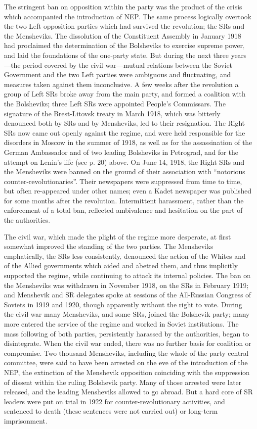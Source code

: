 The stringent ban on opposition within the party was the product of the crisis which accompanied the introduction of NEP. The same process logically overtook the two Left opposition parties which had survived the revolution; the SRs and the Mensheviks. The dissolution of the Constituent Assembly in January 1918 had proclaimed the determination of the Bolsheviks to exercise supreme power, and laid the foundations of the one-party state. But during the next three years---the period covered by the civil war---mutual relations between the Soviet Government and the two Left parties were ambiguous and fluctuating, and measures taken against them inconclusive. A few weeks after the revolution a group of Left SRs broke away from the main party, and formed a coalition with the Bolsheviks; three Left SRs were appointed People's Commissars. The signature of the Brest-Litovsk treaty in March 1918, which was bitterly denounced both by SRs and by Mensheviks, led to their resignation. The Right SRs now came out openly against the regime, and were held responsible for the disorders in Moscow in the summer of 1918, as well as for the assassination of the German Ambassador and of two leading Bolsheviks in Petrograd, and for the attempt on Lenin's life (see p. 20) above. On June 14, 1918, the Right SRs and the Mensheviks were banned on the ground of their association with ``notorious counter-revolutionaries''. Their newspapers were suppressed from time to time, but often re-appeared under other names; even a Kadet newspaper was published for some months after the revolution. Intermittent harassment, rather than the enforcement of a total ban, reflected ambivalence and hesitation on the part of the authorities. 

The civil war, which made the plight of the regime more desperate, at first somewhat improved the standing of the two parties. The Mensheviks emphatically, the SRs less consistently, denounced the action of the Whites and of the Allied governments which aided and abetted them, and thus implicitly supported the regime, while continuing to attack its internal policies. The ban on the Mensheviks was withdrawn in November 1918, on the SRs in February 1919; and Menshevik and SR delegates spoke at sessions of the All-Russian Congress of Soviets in 1919 and 1920, though apparently without the right to vote. During the civil war many Mensheviks, and some SRs, joined the Bolshevik party; many more entered the service of the regime and worked in Soviet institutions. The mass following of both parties, persistently harassed by the authorities, began to disintegrate. When the civil war ended, there was no further basis for coalition or compromise. Two thousand Mensheviks, including the whole of the party central committee, were said to have been arrested on the eve of the introduction of the NEP, the extinction of the Menshevik opposition coinciding with the suppression of dissent within the ruling Bolshevik party. Many of those arrested were later released, and the leading Mensheviks allowed to go abroad. But a hard core of SR leaders were put on trial in 1922 for counter-revolutionary activities, and sentenced to death (these sentences were not carried out) or long-term imprisonment. 

